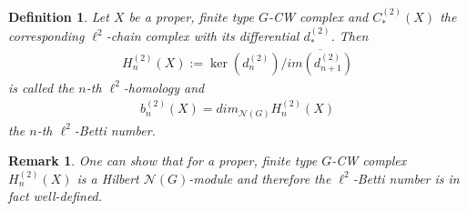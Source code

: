 \documentclass[12pt,a4paper]{scrartcl}
\newtheorem{Definition}[Theorem]{Definition}
\newtheorem{Remark}[Theorem]{Remark}
\numberwithin{equation}{section}
\newcommand{\2}{\mathbb{Z} / 2 \mathbb{Z}}
\newcommand{\1}{\bar{1}}
\newcommand{\0}{\bar{0}}
\begin{document}
\begin{Definition}
	Let $X$ be a proper, finite type $G$-CW complex and $C_*^{(2)}(X)$ the corresponding $\ell^2$-chain complex with its differential $d_*^{(2)}$. Then 
	\begin{align*}
		H_n^{(2)}(X) := \ker(d_n^{(2)}) / \overline{im(d_{n+1}^{(2)})}
	\end{align*}
	is called the \emph{$n$-th $\ell^2$-homology} and 
	\begin{align*}
		b_n^{(2)}(X)=dim_{\mathcal{N}(G)}H_n^{(2)}(X)
	\end{align*}
	the \emph{$n$-th $\ell^2$-Betti number}.
\end{Definition}
\begin{Remark}
	One can show that for a proper, finite type $G$-CW complex $H_n^{(2)}(X)$ is a Hilbert $\mathcal{N}(G)$-module and therefore the $\ell^2$-Betti number is in fact well-defined.
\end{Remark}
\end{document}
